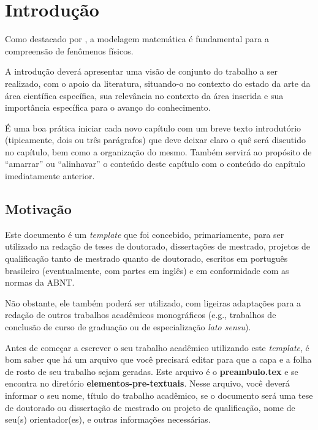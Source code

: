 
\chapter{Introdução}
\label{chap_introducao}

Como destacado por \cite{exemplo2020}, a modelagem matemática é fundamental para a compreensão de fenômenos físicos.

A introdução deverá apresentar uma visão de conjunto do trabalho a ser realizado, com o apoio da literatura, situando-o no contexto do estado da arte da área científica específica, sua relevância no contexto da área inserida e sua importância específica para o avanço do conhecimento.

É uma boa prática iniciar cada novo capítulo com um breve texto introdutório (tipicamente, dois ou três parágrafos) que deve deixar claro o quê será discutido no capítulo, bem como a organização do mesmo.
Também servirá ao propósito de ``amarrar'' ou ``alinhavar'' o conteúdo deste capítulo com o conteúdo do capítulo imediatamente anterior.

\section{Motivação}
\label{sec_motivacao}

Este documento é um \emph{template} que foi concebido, primariamente, para ser utilizado na redação de teses de doutorado, dissertações de mestrado, projetos de qualificação tanto de mestrado quanto de doutorado, escritos em português brasileiro (eventualmente, com partes em inglês) e em conformidade com as normas da ABNT.

Não obstante, ele também poderá ser utilizado, com ligeiras adaptações para a redação de outros trabalhos acadêmicos monográficos (e.g., trabalhos de conclusão de curso de graduação ou de especialização \emph{lato sensu}).

Antes de começar a escrever o seu trabalho acadêmico utilizando este \emph{template}, é bom saber que há um arquivo que você precisará editar para que a capa e a folha de rosto de seu trabalho sejam geradas.
Este arquivo é o \textbf{preambulo.tex} e se encontra no diretório \textbf{elementos-pre-textuais}.
Nesse arquivo, você deverá informar o seu nome, título do trabalho acadêmico, se o documento será uma tese de doutorado ou dissertação de mestrado ou projeto de qualificação, nome de seu(s) orientador(es), e outras informações necessárias.

